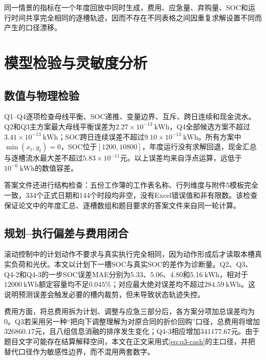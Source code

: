 \documentclass[UTF8,12pt,a4paper]{ctexart}
\theoremstyle{remark}
\begin{document}
同一情景的指标在一个年度回放中同时生成，费用、应急量、弃购量、SOC和运行时间共享完全相同的逐槽轨迹，因而不存在不同表格之间因重复求解设置不同而产生的口径漂移。

\section{模型检验与灵敏度分析}
\subsection{数值与物理检验}
Q1--Q4逐项检查母线平衡、SOC递推、变量边界、互斥、跨日连续和现金流水。Q2和Q3主方案最大母线平衡误差为$2.27\times10^{-13}\ \mathrm{kWh}$，Q4全部候选方案不超过$3.41\times10^{-13}\ \mathrm{kWh}$；SOC跨日连续误差不超过$9.10\times10^{-13}\ \mathrm{kWh}$。所有方案中$\min(x_t,y_t)=0$，SOC位于$[1200,10800]$，年度运行没有求解回退，现金汇总与逐槽流水最大差不超过$5.83\times10^{-11}$元。以上误差均来自浮点运算，远低于$10^{-6}\ \mathrm{kWh}$的数值容差。

答案文件还进行结构检查：五份工作簿的工作表名称、行列维度与附件5模板完全一致，334个正式日期和144个时段均非空，没有Excel错误值和非有限数。该检查保证论文中的年度汇总、逐槽数组和题目要求的答案文件来自同一轮计算。

\subsection{规划--执行偏差与费用闭合}
滚动控制中的计划动作不要求与真实执行完全相同，因为动作形成后才读取本槽真实负荷和光伏。本文以计划下一槽SOC与真实SOC的差作为诊断量。Q2、Q3、Q4-2和Q4-3的一步SOC误差MAE分别为$5.33$、$5.06$、$4.80$和$5.16\ \mathrm{kWh}$，相对于$12000\ \mathrm{kWh}$额定容量均不足$0.045\%$；对应最大绝对误差均不超过$284.59\ \mathrm{kWh}$。这说明预测误差会触发必要的槽内裁剪，但未导致状态轨迹失控。

费用方面，将总费用拆为计划、调整与应急三部分后，各方案分项加总误差均为0。Q3若采用另一种“把向下调整理解为对原合同的折价回购”口径，总费用将增加$326860.17$元，且八组信息消融的排序发生变化；Q4-3相应增加$341177.67$元。由于题目文字可能存在结算解释空间，本文在正文采用式\eqref{eq:q3-cash}的主口径，并把替代口径作为敏感性边界，而不混用两套数字。
\end{document}
